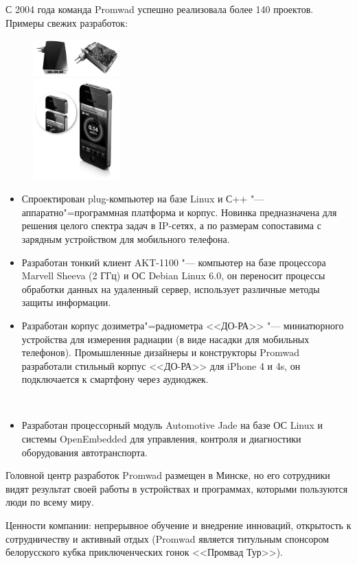 \documentclass[10pt, a5paper]{article}
\begin{document}
С 2004 года команда Promwad успешно реализовала более 140 проектов. Примеры
свежих разработок:\\[-2em]%
\begin{figure}
\begin{center}
\includegraphics[width=0.3\textwidth]{53_spons_promwad_ip-plug-server_print.jpg}\\[4em]%
\includegraphics[width=0.3\textwidth]{53_spons_promwad_dora_iphone_enclosure_print.jpg}
\end{center}
\end{figure}
\begin{itemize}
\item Спроектирован plug-компьютер на базе Linux и С++ "--- аппаратно"=программная
платформа и корпус. Новинка предназначена для решения целого спектра задач в
IP-сетях, а по размерам сопоставима с зарядным устройством для мобильного
телефона.
\item Разработан тонкий клиент AKT-1100 "--- компьютер на базе процессора Marvell Sheeva
(2 ГГц) и ОС Debian Linux 6.0, он переносит процессы обработки данных на
удаленный сервер, использует различные методы защиты информации.
\item Разработан корпус дозиметра"=радиометра <<ДО-РА>> "---  миниатюрного
устройства для измерения радиации (в виде насадки для мобильных телефонов).
Промышленные дизайнеры и конструкторы Promwad разработали стильный корпус
<<ДО-РА>> для iPhone 4 и 4s, он подключается к смартфону через аудиоджек.
\end{itemize}%
~\\[-2.3em]\begin{itemize}%
\item Разработан процессорный модуль Automotive Jade на базе ОС Linux и системы
OpenEmbedded для управления, контроля и диагностики оборудования
автотранспорта.
\end{itemize}
Головной центр разработок Promwad размещен в Минске, но его сотрудники видят
результат своей работы в устройствах и программах, которыми пользуются люди по
всему миру.

Ценности компании: непрерывное обучение и внедрение инноваций, открытость к
сотрудничеству и активный отдых (Promwad является титульным спонсором
белорусского кубка приключенческих гонок <<Промвад Тур>>).
\end{document}
